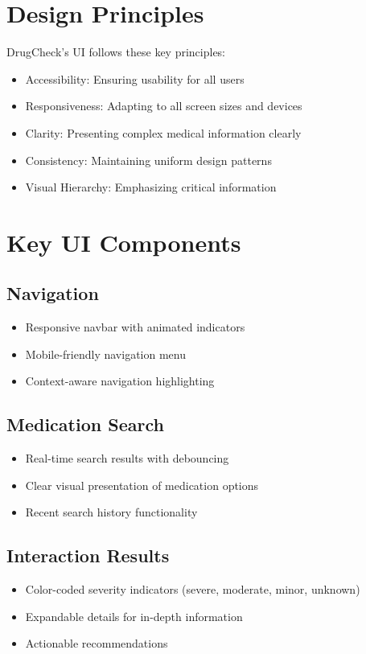 \documentclass[12pt,a4paper]{report}
\begin{document}
\section{Design Principles}
DrugCheck's UI follows these key principles:
\begin{itemize}
    \item Accessibility: Ensuring usability for all users
    \item Responsiveness: Adapting to all screen sizes and devices
    \item Clarity: Presenting complex medical information clearly
    \item Consistency: Maintaining uniform design patterns
    \item Visual Hierarchy: Emphasizing critical information
\end{itemize}

\section{Key UI Components}

\subsection{Navigation}
\begin{itemize}
    \item Responsive navbar with animated indicators
    \item Mobile-friendly navigation menu
    \item Context-aware navigation highlighting
\end{itemize}

\subsection{Medication Search}
\begin{itemize}
    \item Real-time search results with debouncing
    \item Clear visual presentation of medication options
    \item Recent search history functionality
\end{itemize}

\subsection{Interaction Results}
\begin{itemize}
    \item Color-coded severity indicators (severe, moderate, minor, unknown)
    \item Expandable details for in-depth information
    \item Actionable recommendations
\end{itemize}
\end{document}

